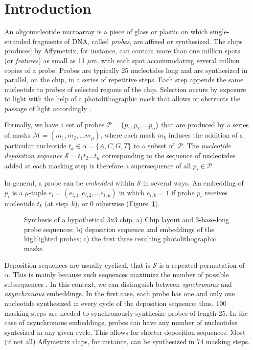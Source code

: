 \documentclass{bioinfo}
\begin{document}
\section{Introduction}

An oligonucleotide microarray is a piece of glass or plastic on which single-stranded fragments of DNA, called \emph{probes}, are affixed or synthesized. The chips produced by Affymetrix, for instance, can contain more than one million spots (or \emph{features}) as small as 11 $\mu$m, with each spot accommodating several million copies of a probe. Probes are typically 25 nucleotides long and are synthesized in parallel, on the chip, in a series of repetitive steps. Each step appends the same nucleotide to probes of selected regions of the chip. Selection occurs by exposure to light with the help of a photolithographic mask that allows or obstructs the passage of light accordingly \citep{FODOR91}.

Formally, we have a set of probes $\mathcal{P} = \{p_{1}, p_{2}, ... p_{n}\}$ that are produced by a series of masks $\mathcal{M} = (m_{1}, m_{2}, ... m_{\mu})$, where each mask $m_{k}$ induces the addition of a particular nucleotide $t_{k} \in \alpha = \{A, C, G, T\}$ to a subset of~$\mathcal{P}$. The \emph{nucleotide deposition sequence} $\mathcal{S} = t_{1} t_{2} \ldots t_{\mu}$ corresponding to the sequence of nucleotides added at each masking step is therefore a supersequence of all $p_{i} \in \mathcal{P}$.

In general, a probe can be \emph{embedded} within $\mathcal{S}$ in several ways. An embedding of $p_{i}$ is a $\mu$-tuple $\varepsilon_{i} = (e_{i,1}, e_{i,2}, ... e_{i,\mu})$ in which $e_{i,k} = 1$ if probe $p_{i}$ receives nucleotide $t_{k}$ (at step~$k$), or 0 otherwise (Figure~\ref{fig:masking_process}).

\begin{figure}
\caption{Synthesis of a hypothetical 3x3 chip. a) Chip layout and 3-base-long probe sequences; b) deposition sequence and embeddings of the highlighted probes; c) the first three resulting photolithographic masks.}
\label{fig:masking_process}
\end{figure}

Deposition sequences are usually cyclical, that is $\mathcal{S}$ is a repeated permutation of $\alpha$. This is mainly because such sequences maximize the number of possible subsequences \citep{CHASE76}. In this context, we can distinguish between \emph{synchronous} and \emph{asynchronous} embeddings. In the first case, each probe has one and only one nucleotide synthesized in every cycle of the deposition sequence; thus, 100 masking steps are needed to synchronously synthesize probes of length 25. In the case of asynchronous embeddings, probes can have any number of nucleotides syntesized in any given cycle. This allows for shorter deposition sequences. Most (if not all) Affymetrix chips, for instance, can be synthesized in 74 masking steps.
\end{document}
